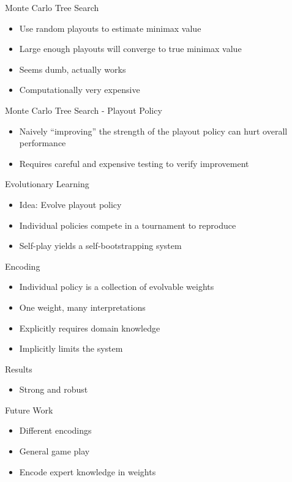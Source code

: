 \documentclass{beamer}
\begin{document}
\begin{frame}{Monte Carlo Tree Search}
\begin{itemize}
	\item Use random playouts to estimate minimax value
	\item Large enough playouts will converge to true minimax value
	\item Seems dumb, actually works
	\item Computationally very expensive
\end{itemize}
\end{frame}

\begin{frame}{Monte Carlo Tree Search - Playout Policy}
\begin{itemize}
	\item Naively ``improving'' the strength of the playout policy can hurt overall performance
	\item Requires careful and expensive testing to verify improvement
\end{itemize}
\end{frame}

\begin{frame}{Evolutionary Learning}
\begin{itemize}
	\item Idea: Evolve playout policy
	\item Individual policies compete in a tournament to reproduce
	\item Self-play yields a self-bootstrapping system
\end{itemize}
\end{frame}

\begin{frame}{Encoding}
\begin{itemize}
	\item Individual policy is a collection of evolvable weights
	\item One weight, many interpretations
	\item Explicitly requires domain knowledge
	\item Implicitly limits the system
\end{itemize}
\end{frame}

\begin{frame}{Results}
\begin{itemize}
	\item Strong and robust
\end{itemize}
\end{frame}

\begin{frame}{Future Work}
\begin{itemize}
	\item Different encodings
	\item General game play
	\item Encode expert knowledge in weights
\end{itemize}
\end{frame}
\end{document}
